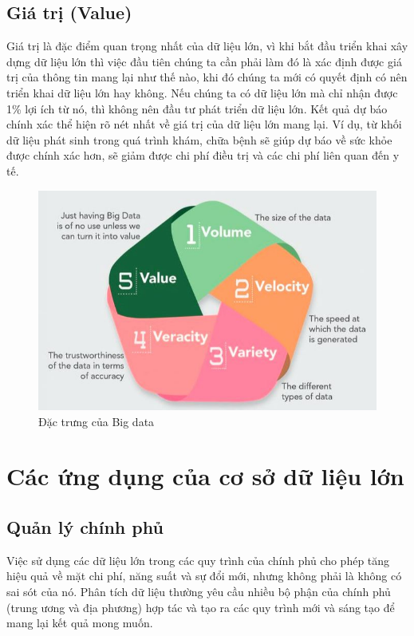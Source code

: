 \documentclass[12pt,a4paper]{report}
\begin{document}
	\subsection{Giá trị (Value)}
	Giá trị là đặc điểm quan trọng nhất của dữ liệu lớn, vì khi bắt đầu triển khai xây dựng dữ liệu lớn thì việc đầu tiên chúng ta cần phải làm đó là xác định được giá trị của thông tin mang lại như thế nào, khi đó chúng ta mới có quyết định có nên triển khai dữ liệu lớn hay không. Nếu chúng ta có dữ liệu lớn mà chỉ nhận được 1\% lợi ích từ nó, thì không nên đầu tư phát triển dữ liệu lớn. Kết quả dự báo chính xác thể hiện rõ nét nhất về giá trị của dữ liệu lớn mang lại. Ví dụ, từ khối dữ liệu phát sinh trong quá trình khám, chữa bệnh sẽ giúp dự báo về sức khỏe được chính xác hơn, sẽ giảm được chi phí điều trị và các chi phí liên quan đến y tế. 
	\begin{figure}[h]
		\centering
		\includegraphics[scale=.6]{b-3.jpg}
		\caption{Đặc trưng của Big data}
	\end{figure}
\section{Các ứng dụng của cơ sở dữ liệu lớn}
\subsection{Quản lý chính phủ}
Việc sử dụng các dữ liệu lớn trong các quy trình của chính phủ cho phép tăng hiệu quả về mặt chi phí, năng suất và sự đổi mới, nhưng không phải là không có sai sót của nó. Phân tích dữ liệu thường yêu cầu nhiều bộ phận của chính phủ (trung ương và địa phương) hợp tác và tạo ra các quy trình mới và sáng tạo để mang lại kết quả mong muốn. 
\end{document}
